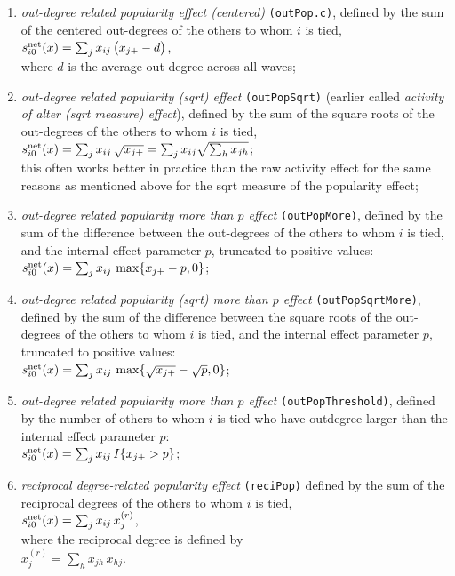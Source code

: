 \documentclass[a4paper,fleqn,11pt]{article}
\newcommand{\+}{\, + \,}
\newcommand{\vit}{\theenumi}
\begin{document}
\begin{enumerate}
 \item {\em out-degree related popularity effect (centered)} \texttt{(outPop.c)},
 defined by the sum of
 the centered out-degrees of the others to whom $i$ is tied,\\
 $s^{\rm net}_{i\vit}(x) =  \sum_j x_{ij}\, \big( x_{j+} - d \big)$,\\
 where $d$ is the average out-degree across all waves;

 \item {\em out-degree related popularity (sqrt) effect} \texttt{(outPopSqrt)}
 (earlier called {\em activity of alter (sqrt measure) effect}), defined by the sum of
 the square roots of the out-degrees of the others to whom $i$ is tied,\\
 $s^{\rm net}_{i\vit}(x) = \sum_j x_{ij}\, \sqrt{x_{j+}} =
  \sum_j x_{ij} \sqrt{\sum_h x_{jh}} $;\\
 this often works better in practice than the raw activity effect
 for the same reasons as mentioned above for the sqrt measure of the popularity effect;

 \item {\em out-degree related popularity more than $p$ effect} \texttt{(outPopMore)}, defined by
  the sum of the difference between the out-degrees  of the others to whom $i$ is tied,
  and the internal effect parameter $p$, truncated to positive values: \\
 $s^{\rm net}_{i\vit}(x) =  \sum_j x_{ij}\, \max\{ x_{j+} - p, 0 \}  $;


 \item {\em out-degree related popularity (sqrt) more than $p$ effect}
 \texttt{(outPopSqrtMore)}, defined by
  the sum of the difference between the square roots of the
  out-degrees  of the others to whom $i$ is tied,
  and the internal effect parameter $p$, truncated to positive values: \\
 $s^{\rm net}_{i\vit}(x) =  \sum_j x_{ij}\, \max\{ \sqrt{x_{j+}} - \sqrt{p}, 0 \}  $;


 \item {\em out-degree related popularity more than $p$ effect} \texttt{(outPopThreshold)}, defined by
  the number of others to whom $i$ is tied who have outdegree larger than the
  internal effect parameter $p$: \\
 $s^{\rm net}_{i\vit}(x) =  \sum_j x_{ij}\, I\{ x_{j+} > p \}  $;


 \item {\em reciprocal degree-related popularity effect} \texttt{(reciPop)}
 defined by the sum of the reciprocal degrees
 of the others to whom $i$ is tied,\\
 $s^{\rm net}_{i\vit}(x) =  \sum_j x_{ij}\, x^{(r)}_{j} $, \\
 where the reciprocal degree is defined by\\
 $ x^{(r)}_{j} = \sum_h x_{jh}\, x_{hj} $.


\end{enumerate}
\end{document}
